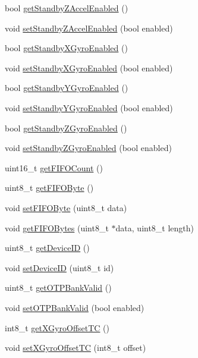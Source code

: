 \begin{DoxyCompactItemize}
bool \hyperlink{classMPU6050_adae85612e047c4c7f0c3b7110fc92956}{get\+Standby\+Z\+Accel\+Enabled} ()
\item 
void \hyperlink{classMPU6050_ac5fd917549d2ed0f12b8a17167271199}{set\+Standby\+Z\+Accel\+Enabled} (bool enabled)
\item 
bool \hyperlink{classMPU6050_acb5fde4167aa54fbbe84706d577a48a6}{get\+Standby\+X\+Gyro\+Enabled} ()
\item 
void \hyperlink{classMPU6050_ac1c6d8f623a9ca00a4ddc50f6615b977}{set\+Standby\+X\+Gyro\+Enabled} (bool enabled)
\item 
bool \hyperlink{classMPU6050_aaad2985f8d22aec123f1e1dabcdd427a}{get\+Standby\+Y\+Gyro\+Enabled} ()
\item 
void \hyperlink{classMPU6050_ab0973d64b7132188539b07991f7ea1f0}{set\+Standby\+Y\+Gyro\+Enabled} (bool enabled)
\item 
bool \hyperlink{classMPU6050_a20f7804db1a980a3c425ae44c33d420b}{get\+Standby\+Z\+Gyro\+Enabled} ()
\item 
void \hyperlink{classMPU6050_ada7c8a873fe157703dcdc08e25b48e32}{set\+Standby\+Z\+Gyro\+Enabled} (bool enabled)
\item 
uint16\+\_\+t \hyperlink{classMPU6050_ad96c7a75a39327ebaae01386bcbc58dd}{get\+F\+I\+F\+O\+Count} ()
\item 
uint8\+\_\+t \hyperlink{classMPU6050_a7733011d30d5b64564f6b5422d8639ae}{get\+F\+I\+F\+O\+Byte} ()
\item 
void \hyperlink{classMPU6050_a66da5bc38aa82404117d1ef5306c951a}{set\+F\+I\+F\+O\+Byte} (uint8\+\_\+t data)
\item 
void \hyperlink{classMPU6050_aba36dcb767b5cd8965053987aaa08a6a}{get\+F\+I\+F\+O\+Bytes} (uint8\+\_\+t $\ast$data, uint8\+\_\+t length)
\item 
uint8\+\_\+t \hyperlink{classMPU6050_a35ae3c8894b3258e642043886801e031}{get\+Device\+ID} ()
\item 
void \hyperlink{classMPU6050_aaefb4b3d93cf4b78d56cd63b10ea0e97}{set\+Device\+ID} (uint8\+\_\+t id)
\item 
uint8\+\_\+t \hyperlink{classMPU6050_a6eb099e3dc96eb4d113cf81804256e8c}{get\+O\+T\+P\+Bank\+Valid} ()
\item 
void \hyperlink{classMPU6050_a074024a7818b2998b3f1c99064bea3a0}{set\+O\+T\+P\+Bank\+Valid} (bool enabled)
\item 
int8\+\_\+t \hyperlink{classMPU6050_afb6b0de954cc89e161e5ac389102af0c}{get\+X\+Gyro\+Offset\+TC} ()
\item 
void \hyperlink{classMPU6050_a571bb0b54080a1def63fb4166b7f7f59}{set\+X\+Gyro\+Offset\+TC} (int8\+\_\+t offset)

\end{DoxyCompactItemize}
